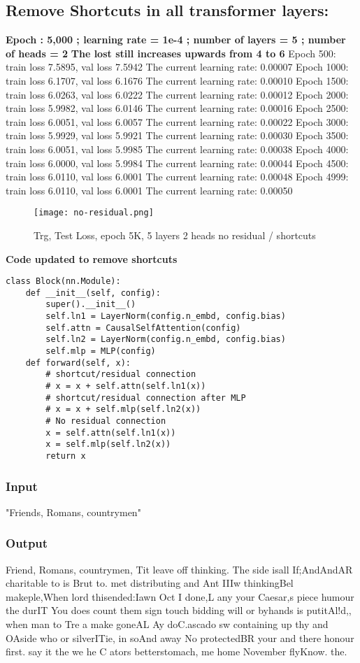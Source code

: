 \documentclass[conference]{IEEEtran}
\begin{document}
\subsection{Remove Shortcuts in all transformer layers:}
\textbf{Epoch : 5,000 ; learning rate = 1e-4 ; number of layers = 5 ; number of heads = 2}
\textbf{The lost still increases upwards from 4 to 6}
Epoch 500: train loss 7.5895, val loss 7.5942
The current learning rate: 0.00007
Epoch 1000: train loss 6.1707, val loss 6.1676
The current learning rate: 0.00010
Epoch 1500: train loss 6.0263, val loss 6.0222
The current learning rate: 0.00012
Epoch 2000: train loss 5.9982, val loss 6.0146
The current learning rate: 0.00016
Epoch 2500: train loss 6.0051, val loss 6.0057
The current learning rate: 0.00022
Epoch 3000: train loss 5.9929, val loss 5.9921
The current learning rate: 0.00030
Epoch 3500: train loss 6.0051, val loss 5.9985
The current learning rate: 0.00038
Epoch 4000: train loss 6.0000, val loss 5.9984
The current learning rate: 0.00044
Epoch 4500: train loss 6.0110, val loss 6.0001
The current learning rate: 0.00048
Epoch 4999: train loss 6.0110, val loss 6.0001
The current learning rate: 0.00050
\begin{figure}[H]
    \centering
    \texttt{[image: no-residual.png]}
    \caption{Trg, Test Loss, epoch 5K, 5 layers 2 heads no residual / shortcuts}
    \label{fig:epoch}
\end{figure}
\textbf{Code updated to remove shortcuts}
\begin{verbatim}
class Block(nn.Module):
    def __init__(self, config):
        super().__init__()
        self.ln1 = LayerNorm(config.n_embd, config.bias)
        self.attn = CausalSelfAttention(config)
        self.ln2 = LayerNorm(config.n_embd, config.bias)
        self.mlp = MLP(config)
    def forward(self, x):
        # shortcut/residual connection
        # x = x + self.attn(self.ln1(x)) 
        # shortcut/residual connection after MLP
        # x = x + self.mlp(self.ln2(x)) 
        # No residual connection
        x = self.attn(self.ln1(x))   
        x = self.mlp(self.ln2(x))   
        return x
\end{verbatim}

\subsubsection{Input}
"Friends, Romans, countrymen"
\subsubsection{Output}
Friend, Romans, countrymen,
 Tit leave off thinking. The side isall If;AndAndAR charitable to is Brut to.
 met distributing and Ant IIIw thinkingBel
makeple,When lord thisended:Iawn Oct I done,L any your Caesar,s piece humour the durIT You does count them sign touch bidding will
 or byhands is putitAl!d,, when man to Tre a make goneAL Ay doC.ascado sw containing up thy and OAside who or silverITie, in soAnd away No protectedBR  your and there honour first. say it the we he C
ators betterstomach, me home November flyKnow. the.
\end{document}
